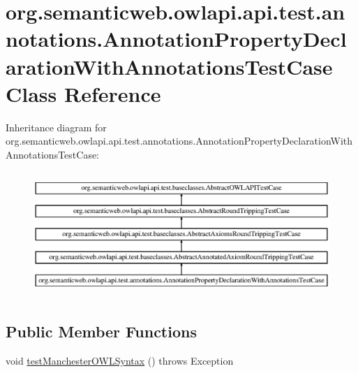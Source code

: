 \hypertarget{classorg_1_1semanticweb_1_1owlapi_1_1api_1_1test_1_1annotations_1_1_annotation_property_declaration_with_annotations_test_case}{\section{org.\-semanticweb.\-owlapi.\-api.\-test.\-annotations.\-Annotation\-Property\-Declaration\-With\-Annotations\-Test\-Case Class Reference}
\label{classorg_1_1semanticweb_1_1owlapi_1_1api_1_1test_1_1annotations_1_1_annotation_property_declaration_with_annotations_test_case}
}
Inheritance diagram for org.\-semanticweb.\-owlapi.\-api.\-test.\-annotations.\-Annotation\-Property\-Declaration\-With\-Annotations\-Test\-Case\-:\begin{figure}[H]
\begin{center}
\leavevmode
\includegraphics[height=4.770017cm]{classorg_1_1semanticweb_1_1owlapi_1_1api_1_1test_1_1annotations_1_1_annotation_property_declaration_with_annotations_test_case}
\end{center}
\end{figure}
\subsection*{Public Member Functions}
\begin{DoxyCompactItemize}
\item 
void \hyperlink{classorg_1_1semanticweb_1_1owlapi_1_1api_1_1test_1_1annotations_1_1_annotation_property_declaration_with_annotations_test_case_a4b542df6e28894557894d7d5bed49bb9}{test\-Manchester\-O\-W\-L\-Syntax} ()  throws Exception 
\end{DoxyCompactItemize}

